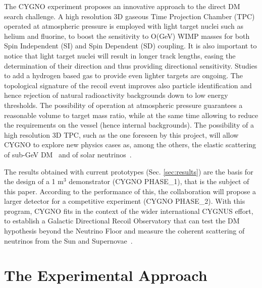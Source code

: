 \documentclass[physics,article,submit,moreauthors,pdftex]{Definitions/mdpi}
\begin{document}
The CYGNO experiment proposes an innovative approach to the direct DM search challenge. A high resolution 3D gaseous Time Projection Chamber (TPC) operated at atmospheric pressure is employed with light target nuclei such as helium and fluorine, to boost the sensitivity to O(GeV) WIMP masses for both Spin Independent (SI) and Spin Dependent (SD) coupling. It is also important to notice that light target nuclei will result in longer track lengths, easing the determination of their direction and thus providing directional sensitivity. Studies to add a hydrogen based gas to provide even lighter targets are ongoing.
The topological signature of the recoil event improves also particle identification and hence rejection of natural radioactivity backgrounds down to low energy thresholds. The possibility of operation at atmospheric pressure  guarantees a reasonable volume to target mass ratio, while at the same time allowing to reduce the requirements on the vessel (hence internal backgrounds). 
The possibility of a high resolution 3D TPC, such as the one foreseen by this project,  will allow CYGNO to explore new physics cases as, among the others, the elastic scattering of sub-GeV DM~\cite{Baracchini:2020owr} and of solar neutrinos~\cite{Seguinot:1992zu,Arpesella:1996uc}.

The results obtained with current prototypes (Sec. \ref{sec:results}) 
are the basis for the design of a 1 m$^3$ demonstrator (CYGNO PHASE\_1), that is the subject of this paper. 
According to the performance of this, the collaboration will propose a larger detector for a competitive experiment (CYGNO PHASE\_2).
With this program, CYGNO fits in the context of the wider international CYGNUS effort, to establish a Galactic Directional Recoil Observatory that can test the DM hypothesis beyond the Neutrino Floor and measure the coherent scattering of neutrinos from the Sun and Supernovae~\cite{Vahsen:2020pzb}.




\section{The Experimental Approach}\label{sec:project}
\end{document}
